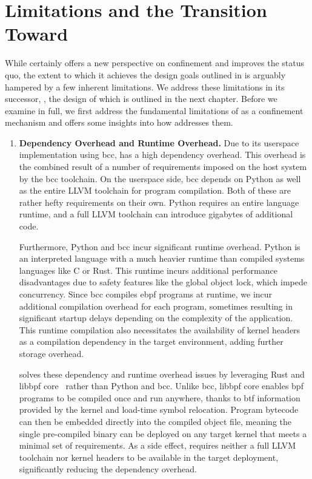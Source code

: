 \section{Limitations and the Transition Toward \bpfcontain{}}%
\label{s:bpfbox-bpfcontain}

While \bpfbox{} certainly offers a new perspective on confinement and improves the status
quo, the extent to which it achieves the design goals outlined in  is
arguably hampered by a few inherent limitations. We address these limitations in its
successor, \bpfcontain{}, the design of which is outlined in the next chapter. Before we
examine \bpfcontain{} in full, we first address the fundamental limitations of \bpfbox{}
as a confinement mechanism and offers some insights into how \bpfcontain{} addresses them.
\begin{enumerate}
  \item \textbf{Dependency Overhead and Runtime Overhead.}
    Due to its userspace implementation using bcc, \bpfbox{} has a high dependency
    overhead. This overhead is the combined result of a number of requirements imposed on
    the host system by the bcc toolchain. On the userspace side, bcc depends on Python as
    well as the entire LLVM toolchain for program compilation. Both of these are rather
    hefty requirements on their own. Python requires an entire language runtime, and
    a full LLVM toolchain can introduce gigabytes of additional code.

    Furthermore, Python and bcc incur significant runtime overhead. Python is an
    interpreted language with a much heavier runtime than compiled systems languages like
    C or Rust.  This runtime incurs additional performance disadvantages due to safety
    features like the global object lock, which impede concurrency. Since bcc compiles
    \gls{ebpf} programs at runtime, we incur additional compilation overhead for each
    program, sometimes resulting in significant startup delays depending on the complexity
    of the application. This runtime compilation also necessitates the availability of
    kernel headers as a compilation dependency in the target environment, adding further
    storage overhead.

    \bpfcontain{} solves these dependency and runtime overhead issues by leveraging Rust
    and libbpf \gls{core}~\cite{nakryiko2020_core} rather than Python and bcc.  Unlike
    bcc, libbpf \gls{core} enables \gls{bpf} programs to be compiled once and run
    anywhere, thanks to \gls{btf} information provided by the kernel and load-time symbol
    relocation. Program bytecode can then be embedded directly into the compiled object
    file, meaning the single pre-compiled \bpfcontain{} binary can be deployed on any
    target kernel that meets a minimal set of requirements. As a side effect,
    \bpfcontain{} requires neither a full LLVM toolchain nor kernel headers to be
    available in the target deployment, significantly reducing the dependency overhead.


\end{enumerate}

